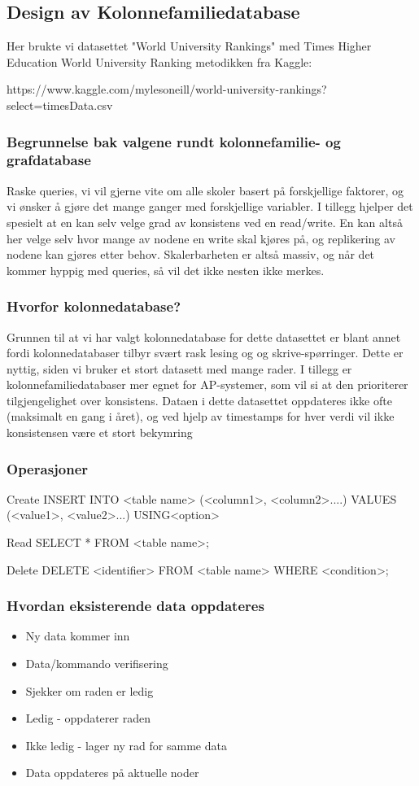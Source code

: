 \subsection{Design av Kolonnefamiliedatabase}
Her brukte vi datasettet "World University Rankings" med Times Higher Education World University Ranking metodikken fra Kaggle:

https://www.kaggle.com/mylesoneill/world-university-rankings?select=timesData.csv

\subsubsection{Begrunnelse bak valgene rundt kolonnefamilie- og grafdatabase}
Raske queries, vi vil gjerne vite om alle skoler basert på forskjellige faktorer, og vi ønsker å gjøre det 
mange ganger med forskjellige variabler. I tillegg hjelper det spesielt at en kan selv velge grad av 
konsistens ved en read/write. En kan altså her velge selv hvor mange av nodene en write skal kjøres 
på, og replikering av nodene kan gjøres etter behov. Skalerbarheten er altså massiv, og når det 
kommer hyppig med queries, så vil det ikke nesten ikke merkes.

\subsubsection{Hvorfor kolonnedatabase?}
Grunnen til at vi har valgt kolonnedatabase for dette datasettet er blant annet fordi 
kolonnedatabaser tilbyr svært rask lesing og og skrive-spørringer. Dette er nyttig, siden vi bruker et 
stort datasett med mange rader. I tillegg er kolonnefamiliedatabaser mer egnet for AP-systemer, 
som vil si at den prioriterer tilgjengelighet over konsistens. Dataen i dette datasettet oppdateres ikke 
ofte (maksimalt en gang i året), og ved hjelp av timestamps for hver verdi vil ikke konsistensen være 
et stort bekymring

\subsubsection{Operasjoner}
Create
INSERT INTO <table name>
(<column1>, <column2>....)
VALUES (<value1>, <value2>...)
USING<option>

Read
SELECT * FROM <table name>;

Delete
DELETE <identifier> FROM <table name> WHERE <condition>;

\subsubsection{Hvordan eksisterende data oppdateres}
\begin{itemize}
  \item Ny data kommer inn
  \item Data/kommando verifisering
  \item Sjekker om raden er ledig
  \item Ledig - oppdaterer raden
  \item Ikke ledig - lager ny rad for samme data
  \item Data oppdateres på aktuelle noder
\end{itemize}

